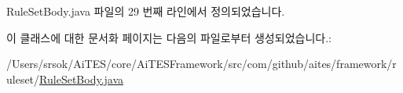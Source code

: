 Rule\+Set\+Body.\+java 파일의 29 번째 라인에서 정의되었습니다.



이 클래스에 대한 문서화 페이지는 다음의 파일로부터 생성되었습니다.\+:\begin{DoxyCompactItemize}
\item 
/\+Users/srsok/\+Ai\+T\+E\+S/core/\+Ai\+T\+E\+S\+Framework/src/com/github/aites/framework/ruleset/\mbox{\hyperlink{_rule_set_body_8java}{Rule\+Set\+Body.\+java}}\end{DoxyCompactItemize}
